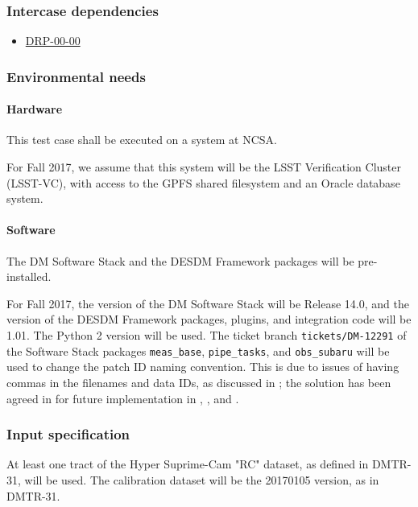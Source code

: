 \subsubsection{Intercase dependencies}

\begin{itemize}

  \item{\hyperref[drp-00-00]{DRP-00-00}}

\end{itemize}

\subsubsection{Environmental needs}

\paragraph{Hardware}\label{sec:hardware}

This test case shall be executed on a system at NCSA.

For Fall 2017, we assume that this system will be the LSST Verification Cluster (LSST-VC),
with access to the GPFS shared filesystem and an Oracle database system.

\paragraph{Software}\label{sec:software}
The DM Software Stack and the DESDM Framework packages will be pre-installed.

For Fall 2017, the version of the DM Software Stack will be Release 14.0, and the version of the DESDM Framework packages, plugins, and integration code will be 1.01.
The Python 2 version will be used.
The ticket branch \texttt{tickets/DM-12291} of the Software Stack packages \texttt{meas{\_}base}, \texttt{pipe{\_}tasks}, and \texttt{obs{\_}subaru} will be used to change the patch ID naming convention.
This is due to issues of having commas in the filenames and data IDs, as discussed in ; the solution has been agreed in  for future implementation in , , and .

\subsubsection{Input specification}\label{sec:input}

At least one tract of the Hyper Suprime-Cam "RC" dataset, as defined in DMTR-31, will be used.
The calibration dataset will be the 20170105 version, as in DMTR-31.



